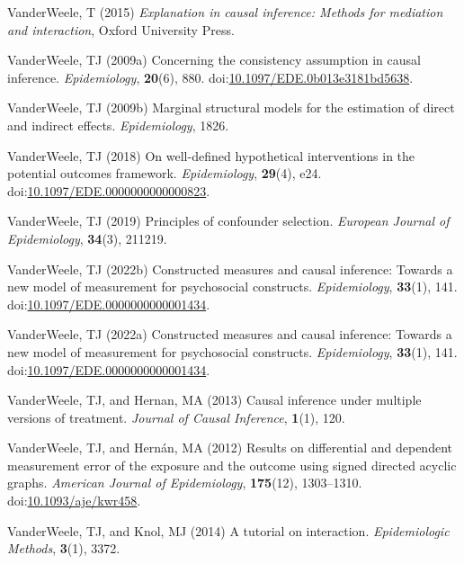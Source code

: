 \documentclass[
  singlecolumn,
  9pt]{article}
\begin{document}
\begin{CSLReferences}
VanderWeele, T (2015) \emph{Explanation in causal inference: Methods for
mediation and interaction}, Oxford University Press.

VanderWeele, TJ (2009a) Concerning the consistency assumption in causal
inference. \emph{Epidemiology}, \textbf{20}(6), 880.
doi:\href{https://doi.org/10.1097/EDE.0b013e3181bd5638}{10.1097/EDE.0b013e3181bd5638}.

VanderWeele, TJ (2009b) Marginal structural models for the estimation of
direct and indirect effects. \emph{Epidemiology}, 1826.

VanderWeele, TJ (2018) On well-defined hypothetical interventions in the
potential outcomes framework. \emph{Epidemiology}, \textbf{29}(4), e24.
doi:\href{https://doi.org/10.1097/EDE.0000000000000823}{10.1097/EDE.0000000000000823}.

VanderWeele, TJ (2019) Principles of confounder selection.
\emph{European Journal of Epidemiology}, \textbf{34}(3), 211219.

VanderWeele, TJ (2022b) Constructed measures and causal inference:
Towards a new model of measurement for psychosocial constructs.
\emph{Epidemiology}, \textbf{33}(1), 141.
doi:\href{https://doi.org/10.1097/EDE.0000000000001434}{10.1097/EDE.0000000000001434}.

VanderWeele, TJ (2022a) Constructed measures and causal inference:
Towards a new model of measurement for psychosocial constructs.
\emph{Epidemiology}, \textbf{33}(1), 141.
doi:\href{https://doi.org/10.1097/EDE.0000000000001434}{10.1097/EDE.0000000000001434}.

VanderWeele, TJ, and Hernan, MA (2013) Causal inference under multiple
versions of treatment. \emph{Journal of Causal Inference},
\textbf{1}(1), 120.

VanderWeele, TJ, and Hernán, MA (2012) Results on differential and
dependent measurement error of the exposure and the outcome using signed
directed acyclic graphs. \emph{American Journal of Epidemiology},
\textbf{175}(12), 1303--1310.
doi:\href{https://doi.org/10.1093/aje/kwr458}{10.1093/aje/kwr458}.

VanderWeele, TJ, and Knol, MJ (2014) A tutorial on interaction.
\emph{Epidemiologic Methods}, \textbf{3}(1), 3372.


\end{CSLReferences}
\end{document}
